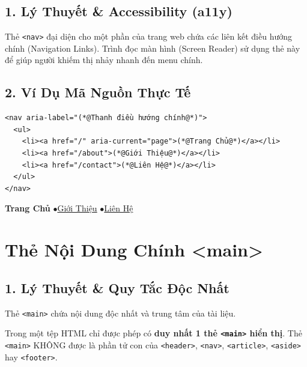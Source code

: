 \documentclass[11pt,oneside]{book}
\newcommand{\codeinline}[1]{\textcolor{accentOrange}{\texttt{#1}}}
\begin{document}
\subsection{1. Lý Thuyết \& Accessibility (a11y)}
Thẻ \codeinline{<nav>} đại diện cho một phần của trang web chứa các liên kết điều hướng chính (Navigation Links). Trình đọc màn hình (Screen Reader) sử dụng thẻ này để giúp người khiếm thị nhảy nhanh đến menu chính.

\subsection{2. Ví Dụ Mã Nguồn Thực Tế}
\begin{codeWindow}
\begin{lstlisting}[language=HTML5]
<nav aria-label="(*@Thanh điều hướng chính@*)">
  <ul>
    <li><a href="/" aria-current="page">(*@Trang Chủ@*)</a></li>
    <li><a href="/about">(*@Giới Thiệu@*)</a></li>
    <li><a href="/contact">(*@Liên Hệ@*)</a></li>
  </ul>
</nav>
\end{lstlisting}
\end{codeWindow}

\begin{browserWindow}
\sffamily\small
\textcolor{primaryBlue}{\bfseries Trang Chủ} \quad$\bullet$\quad \textcolor{primaryBlue}{\underline{Giới Thiệu}} \quad$\bullet$\quad \textcolor{primaryBlue}{\underline{Liên Hệ}}
\end{browserWindow}

\section{Thẻ Nội Dung Chính <main>}
\subsection{1. Lý Thuyết \& Quy Tắc Độc Nhất}
Thẻ \codeinline{<main>} chứa nội dung độc nhất và trung tâm của tài liệu.

\begin{warnBox}
Trong một tệp HTML chỉ được phép có \textbf{duy nhất 1 thẻ \codeinline{<main>} hiển thị}. Thẻ \codeinline{<main>} KHÔNG được là phần tử con của \codeinline{<header>}, \codeinline{<nav>}, \codeinline{<article>}, \codeinline{<aside>} hay \codeinline{<footer>}.
\end{warnBox}
\end{document}
